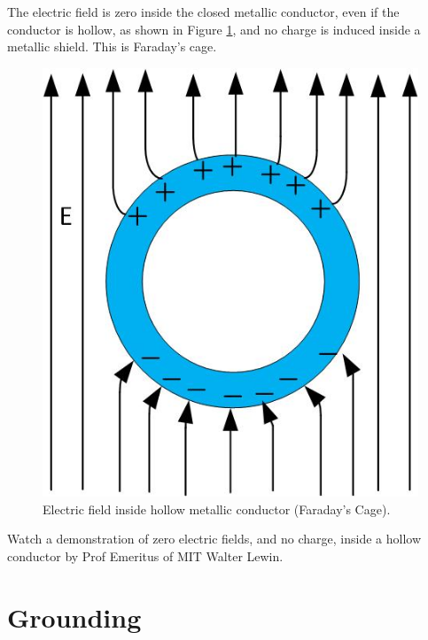 \documentclass{ximera}
\begin{document}
The electric field is zero inside the closed metallic conductor, even if the conductor is hollow, as shown in Figure \ref{fig:HollowConductor}, and no charge is induced inside a metallic shield. This is Faraday's cage.


\begin{figure}[htbp]
\begin{center}
\includegraphics[scale=1]{../jpg/hollowConductor.jpg}
\end{center}
\caption{Electric field inside hollow metallic conductor (Faraday's Cage).}
\label{fig:HollowConductor}
\end{figure}


 Watch a demonstration of zero electric fields, and no charge, inside a hollow conductor by Prof Emeritus of MIT Walter Lewin. 


\begin{center}  
\end{center} 



\section{Grounding}
\end{document}

